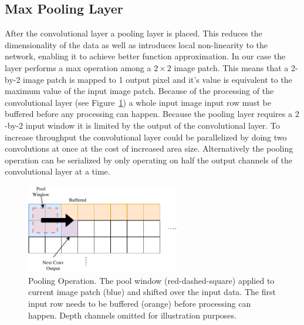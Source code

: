 \subsection{Max Pooling Layer}

After the convolutional layer a pooling layer is placed. This reduces the dimensionality of the data as well as introduces local non-linearity to the network, enabling it to achieve better function approximation. In our case the layer performs a max operation among a $2 \times 2$ image patch. This means that a 2-by-2 image patch is mapped to 1 output pixel and it's value is equivalent to the maximum value of the input image patch.
Because of the processing of the convolutional layer (see Figure~\ref{fig:hw-conv-operation}) a whole input image input row must be buffered before any processing can happen. Because the pooling layer requires a $2$-by-$2$ input window it is limited by the output of the convolutional layer. To increase throughput the convolutional layer could be parallelized by doing two convolutions at once at the cost of increased area size. Alternatively the pooling operation can be serialized by only operating on half the output channels of the convolutional layer at a time.

\begin{figure}[hb]
	\centering
	\includegraphics[width=0.6\textwidth]{img/pool}
	\caption[Pooling Operation]{Pooling Operation. The pool window (red-dashed-square) applied to current image patch (blue) and shifted over the input data. The first input row needs to be buffered (orange) before processing can happen. Depth channels omitted for illustration purposes.}
	\label{fig:hw-conv-operation}
\end{figure}



